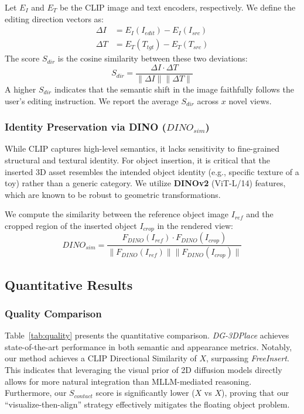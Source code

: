\documentclass[pdflatex,sn-mathphys-num]{sn-jnl}%
\theoremstyle{thmstyleone}%
\theoremstyle{thmstyletwo}%
\theoremstyle{thmstylethree}%
\begin{document}
Let $E_I$ and $E_T$ be the CLIP image and text encoders, respectively. We define the editing direction vectors as:
\begin{align}
\Delta I &= E_I(I_{edit}) - E_I(I_{src}) \\
\Delta T &= E_T(T_{tgt}) - E_T(T_{src})
\end{align}
The score $S_{dir}$ is the cosine similarity between these two deviations:
\begin{equation}
S_{dir} = \frac{\Delta I \cdot \Delta T}{\| \Delta I \| \| \Delta T \|}
\label{eq:clip_dir}
\end{equation}
A higher $S_{dir}$ indicates that the semantic shift in the image faithfully follows the user's editing instruction. We report the average $S_{dir}$ across $x$ novel views.

\subsubsection{Identity Preservation via DINO ($DINO_{sim}$)}
While CLIP captures high-level semantics, it lacks sensitivity to fine-grained structural and textural identity. For object insertion, it is critical that the inserted 3D asset resembles the intended object identity (e.g., specific texture of a toy) rather than a generic category. We utilize \textbf{DINOv2} (ViT-L/14) features, which are known to be robust to geometric transformations.

We compute the similarity between the reference object image $I_{ref}$ and the cropped region of the inserted object $I_{crop}$ in the rendered view:
\begin{equation}
DINO_{sim} = \frac{F_{DINO}(I_{ref}) \cdot F_{DINO}(I_{crop})}{\| F_{DINO}(I_{ref}) \| \| F_{DINO}(I_{crop}) \|}
\label{eq:dino_sim}
\end{equation}

\subsection{Quantitative Results}

\subsubsection{Quality Comparison}
Table~\ref{tab:quality} presents the quantitative comparison. \textit{DG-3DPlace} achieves state-of-the-art performance in both semantic and appearance metrics. Notably, our method achieves a CLIP Directional Similarity of $X$, surpassing \textit{FreeInsert}. This indicates that leveraging the visual prior of 2D diffusion models directly allows for more natural integration than MLLM-mediated reasoning. Furthermore, our $S_{contact}$ score is significantly lower ($X$ vs $X$), proving that our ``visualize-then-align'' strategy effectively mitigates the floating object problem.
\end{document}
